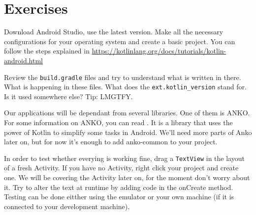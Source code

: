 \section{Exercises}
\begin{exercise}
	Download Android Studio, use the latest version. Make all the necessary configurations for your operating system and create a basic project. You can follow the steps explained in \url{https://kotlinlang.org/docs/tutorials/kotlin-android.html}
\end{exercise}

\begin{exercise}
	Review the \texttt{build.gradle} files and try to understand what is written in there. What is happening in these files. What does the \texttt{ext.kotlin\_version} stand for. Is it used somewhere else? Tip: LMGTFY.
\end{exercise}

 \begin{exercise}
 	Our applications will be dependant from several libraries. One of them is ANKO. For some information on ANKO, you can read \cite{Bukros2017}. It is  a library that uses the power of Kotlin to simplify some
 	tasks in Android. We’ll need more parts of Anko later on, but for now it’s enough to
 	add anko-common to your project. 
 \end{exercise}

\begin{exercise}
	In order to test whether everying is working fine, drag a \texttt{TextView} in the layout of a fresh Activity. If you have no Activity, right click your project and create one. We will be covering the Activity later on, for the moment don't worry about it. Try to alter the text at runtime by adding code in the onCreate method. Testing can be done eitther using the emulator or your own machine (if it is connected to your development machine).
\end{exercise}